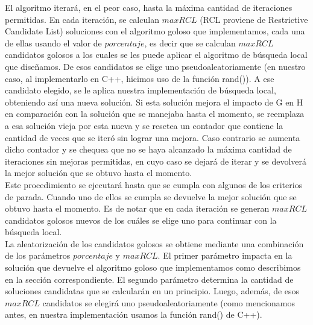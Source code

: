 \indent El algoritmo iterará, en el peor caso, hasta la máxima cantidad de iteraciones permitidas. En cada iteración, se calculan $maxRCL$ (RCL proviene de Restrictive Candidate List) soluciones con el algoritmo goloso que implementamos, cada una de ellas usando el valor de $porcentaje$, es decir que se calculan $maxRCL$ candidatos golosos a los cuales se les puede aplicar el algoritmo de búsqueda local que diseñamos. De esos candidatos se elige uno pseudoaleatoriamente (en nuestro caso, al implementarlo en C++, hicimos uso de la función rand()). A ese candidato elegido, se le aplica nuestra implementación de búsqueda local, obteniendo así una nueva solución. Si esta solución mejora el impacto de G en H en comparación con la solución que se manejaba hasta el momento, se reemplaza a esa solución vieja por esta nueva y se resetea un contador que contiene la cantidad de veces que se iteró sin lograr una mejora. Caso contrario se aumenta dicho contador y se chequea que no se haya alcanzado la máxima cantidad de iteraciones sin mejoras permitidas, en cuyo caso se dejará de iterar y se devolverá la mejor solución que se obtuvo hasta el momento.\\
\indent Este procedimiento se ejecutará hasta que se cumpla con algunos de los criterios de parada. Cuando uno de ellos se cumpla se devuelve la mejor solución que se obtuvo hasta el momento. Es de notar que en cada iteración se generan $maxRCL$ candidatos golosos nuevos de los cuáles se elige uno para continuar con la búsqueda local.\\
\indent La aleatorización de los candidatos golosos se obtiene mediante una combinación de los parámetros $porcentaje$ y $maxRCL$. El primer parámetro impacta en la solución que devuelve el algoritmo goloso que implementamos como describimos en la sección correspondiente. El segundo parámetro determina la cantidad de soluciones candidatas que se calcularán en un principio. Luego, además, de esos $maxRCL$ candidatos se elegirá uno pseudoaleatoriamente (como mencionamos antes, en nuestra implementación usamos la función rand() de C++).\\


